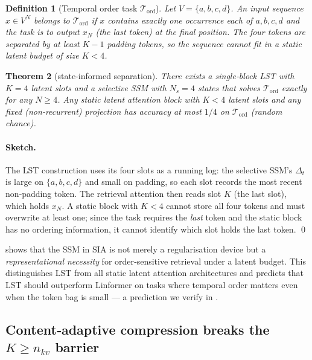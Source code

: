 \documentclass[10pt,twocolumn,letterpaper]{article}
\newcommand{\LST}{\textsc{LST}}
\newcommand{\SIA}{\textsc{SIA}}
\newtheorem{theorem}{Theorem}
\newtheorem{definition}[theorem]{Definition}
\begin{document}
\begin{definition}[Temporal order task $\mathcal{T}_{\mathrm{ord}}$]
\label{def:tord}
Let $V\!=\!\{a, b, c, d\}$.  An input sequence $x\!\in\!V^N$ belongs to
$\mathcal{T}_{\mathrm{ord}}$ if $x$ contains exactly one occurrence each
of $a, b, c, d$ and the task is to output $x_{N}$ (the last token) at the
final position.  The four tokens are separated by at least $K\!-\!1$
padding tokens, so the sequence cannot fit in a static latent budget of
size $K\!<\!4$.
\end{definition}

\begin{theorem}[state‑informed separation]
\label{thm:siac}
There exists a single‑block \LST{} with $K\!=\!4$ latent slots and a
selective SSM with $N_s\!=\!4$ states that solves $\mathcal{T}_{\mathrm{ord}}$
exactly for any $N\!\geq\!4$.  Any static latent attention block with
$K\!<\!4$ latent slots and any fixed (non‑recurrent) projection has
accuracy at most $1/4$ on $\mathcal{T}_{\mathrm{ord}}$ (random chance).
\end{theorem}

\paragraph{Sketch.}
The \LST{} construction uses its four slots as a running log: the
selective SSM's $\Delta_t$ is large on $\{a,b,c,d\}$ and small on padding,
so each slot records the most recent non‑padding token.  The retrieval
attention then reads slot $K$ (the last slot), which holds $x_N$.  A
static block with $K\!<\!4$ cannot store all four tokens and must
overwrite at least one; since the task requires the \emph{last} token and
the static block has no ordering information, it cannot identify which
slot holds the last token.  \qed

 shows that the SSM in \SIA{} is not merely a
regularisation device but a \emph{representational necessity} for
order‑sensitive retrieval under a latent budget.  This distinguishes
\LST{} from all static latent attention architectures and predicts that
\LST{} should outperform Linformer on tasks where temporal order matters
even when the token bag is small — a prediction we verify in
.

\subsection{Content‑adaptive compression breaks the \texorpdfstring{$K\!\geq\!n_{kv}$}{K>=n\_kv} barrier}
\label{sec:caca}
\end{document}
